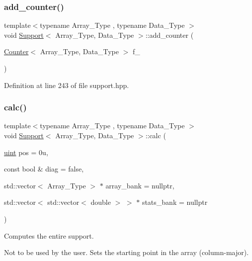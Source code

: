 \subsubsection{\texorpdfstring{add\+\_\+counter()}{add\_counter()}\hspace{0.1cm}{\footnotesize\ttfamily [2/2]}}
{\footnotesize\ttfamily template$<$typename Array\+\_\+\+Type , typename Data\+\_\+\+Type $>$ \\
void \hyperlink{class_support}{Support}$<$ Array\+\_\+\+Type, Data\+\_\+\+Type $>$\+::add\+\_\+counter (\begin{DoxyParamCaption}\item[{\hyperlink{class_counter}{Counter}$<$ Array\+\_\+\+Type, Data\+\_\+\+Type $>$}]{f\+\_\+ }\end{DoxyParamCaption})\hspace{0.3cm}{\ttfamily [inline]}}



Definition at line 243 of file support.\+hpp.

\mbox{\label{class_support_ab5261952be0746f188ee024e3e8c26c1}} 
\subsubsection{\texorpdfstring{calc()}{calc()}}
{\footnotesize\ttfamily template$<$typename Array\+\_\+\+Type , typename Data\+\_\+\+Type $>$ \\
void \hyperlink{class_support}{Support}$<$ Array\+\_\+\+Type, Data\+\_\+\+Type $>$\+::calc (\begin{DoxyParamCaption}\item[{\hyperlink{typedefs_8hpp_a91ad9478d81a7aaf2593e8d9c3d06a14}{uint}}]{pos = {\ttfamily 0u},  }\item[{const bool \&}]{diag = {\ttfamily false},  }\item[{std\+::vector$<$ Array\+\_\+\+Type $>$ $\ast$}]{array\+\_\+bank = {\ttfamily nullptr},  }\item[{std\+::vector$<$ std\+::vector$<$ double $>$ $>$ $\ast$}]{stats\+\_\+bank = {\ttfamily nullptr} }\end{DoxyParamCaption})\hspace{0.3cm}{\ttfamily [inline]}}



Computes the entire support. 

Not to be used by the user. Sets the starting point in the array (column-\/major).


